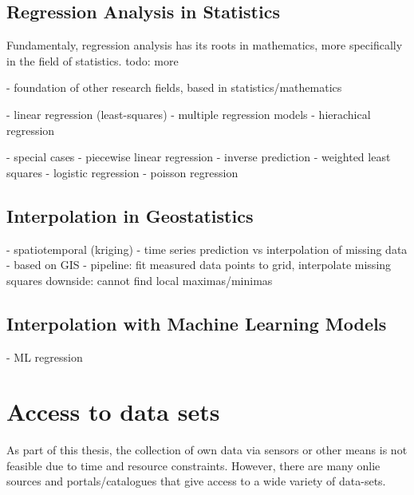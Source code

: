 \subsection{Regression Analysis in Statistics}

Fundamentaly, regression analysis has its roots in mathematics, more specifically in the field of statistics.
todo: more

- foundation of other research fields, based in statistics/mathematics

- linear regression (least-squares)
- multiple regression models
- hierachical regression

- special cases
    - piecewise linear regression
    - inverse prediction
    - weighted least squares
    - logistic regression
    - poisson regression

\subsection{Interpolation in Geostatistics}

- spatiotemporal (kriging)
- time series prediction vs interpolation of missing data
- based on GIS 
- pipeline: fit measured data points to grid, interpolate missing squares
downside: cannot find local maximas/minimas

\subsection{Interpolation with Machine Learning Models}


- ML regression

\section{Access to data sets}
\label{sec: access to data sets}


As part of this thesis, the collection of own data via sensors or other means is not feasible due to time and resource constraints. However, there are many onlie sources and portals/catalogues that give access to a wide variety of data-sets.

